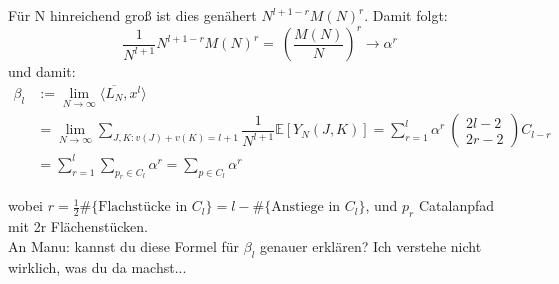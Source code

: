 \documentclass[a4paper, 11pt]{scrreprt}
\newcommand{\EE}{\mathbb{E}}
\begin{document}
Für N hinreichend groß ist dies genähert \(N^{l+1-r}M(N)^r\). Damit folgt:
	\begin{equation}
		\frac {1}{N^{l+1}} N^{l+1-r}M(N)^r =~ \left( \dfrac{M(N)}{N}\right)^{r}\to \alpha^r
	\end{equation}
und damit:
	\begin{equation}
	\begin{split}
		\beta_l &:= \lim_{N\to\infty} \langle \overline{L_N}, x^l \rangle\\
		&= \lim_{N \to \infty} \sum_{J,K: v(J)+v(K) = l+1} \dfrac{1}{N^{l+1}}\EE[Y_N(J,K)] = \sum_{r=1}^{l} \alpha^r\ \begin{pmatrix} 2l-2\\2r-2\end{pmatrix} C_{l-r} \\
		&= \sum_{r=1}^{l} \sum_{p_{r} \in C_{l}} \alpha^{r} = \sum_{p\in C_l} \alpha^r
	\end{split}
	\end{equation}

wobei \(r = \frac 1 2 \#\{\text{Flachstücke in }C_l\} = l  - \#\{\text{Anstiege in }  C_l\}\), und $ p_{r} $ Catalanpfad mit 2r Flächenstücken.\\



An Manu: kannst du diese Formel für \(\beta_l\) genauer erklären? Ich verstehe nicht wirklich, was du da machst...\\
\end{document}
